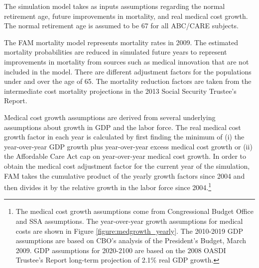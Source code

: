 \noindent The simulation model takes as inputs assumptions regarding the normal retirement age, future improvements in mortality, and real medical cost growth.
The normal retirement age is assumed to be 67 for all ABC/CARE subjects.

\noindent The FAM mortality model represents mortality rates in 2009.
The estimated mortality probabilities are reduced in simulated future years to represent improvements in mortality from sources such as medical innovation that are not included in the model.
There are different adjustment factors for the populations under and over the age of 65.
The mortality reduction factors are taken from the intermediate cost mortality projections in the 2013 Social Security Trustee's Report.


\noindent Medical cost growth assumptions are derived from several underlying assumptions about growth in GDP and the labor force.
The real medical cost growth factor in each year is calculated by first finding the minimum of (i) the year-over-year GDP growth plus year-over-year excess medical cost growth or (ii) the Affordable Care Act cap on year-over-year medical cost growth. In order to obtain the medical cost adjustment factor for the current year of the simulation, FAM takes the cumulative product of the yearly growth factors since 2004 and then divides it by the relative growth in the labor force since 2004.\footnote{The medical cost growth assumptions come from Congressional Budget Office and SSA assumptions.
The year-over-year growth assumptions for medical costs are shown in Figure \ref{figure:medgrowth_yearly}.
The 2010-2019 GDP assumptions are based on CBO's analysis of the President's Budget, March 2009.
GDP assumptions for 2020-2100 are based on the 2008 OASDI Trustee's Report long-term projection of 2.1\% real GDP growth.}


